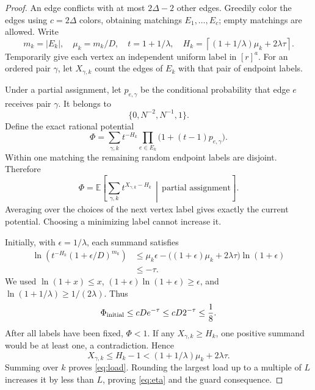 \documentclass[11pt]{article}
\theoremstyle{remark}\newtheorem{remark}[theorem]{Remark}
\newcommand{\ceil}[1]{\left\lceil #1\right\rceil}
\begin{document}
\begin{proof}
An edge conflicts with at most \(2\Delta-2\) other edges. Greedily color the edges using \(c=2\Delta\) colors, obtaining matchings \(E_1,\ldots,E_c\); empty matchings are allowed. Write
\[
 m_k=|E_k|,\quad \mu_k=m_k/D,\quad t=1+1/\lambda,
 \quad H_k=\ceil{(1+1/\lambda)\mu_k+2\lambda\tau}.
\]
Temporarily give each vertex an independent uniform label in \([r]^a\). For an ordered pair \(\gamma\), let \(X_{\gamma,k}\) count the edges of \(E_k\) with that pair of endpoint labels.

Under a partial assignment, let \(p_{e,\gamma}\) be the conditional probability that edge \(e\) receives pair \(\gamma\). It belongs to
\[
 \{0,N^{-2},N^{-1},1\}.
\]
Define the exact rational potential
\begin{equation}
 \Phi=\sum_{\gamma,k}t^{-H_k}
       \prod_{e\in E_k}\bigl(1+(t-1)p_{e,\gamma}\bigr).
 \label{eq:potential}
\end{equation}
Within one matching the remaining random endpoint labels are disjoint. Therefore
\[
 \Phi=\mathbb E\left[\sum_{\gamma,k}t^{X_{\gamma,k}-H_k}
             \,\middle|\,\text{partial assignment}\right].
\]
Averaging over the choices of the next vertex label gives exactly the current potential. Choosing a minimizing label cannot increase it.

Initially, with \(\epsilon=1/\lambda\), each summand satisfies
\begin{align*}
 \ln\!\left(t^{-H_k}(1+\epsilon/D)^{m_k}\right)
 &\le \mu_k\epsilon-\bigl((1+\epsilon)\mu_k+2\lambda\tau\bigr)
                            \ln(1+\epsilon)\\
 &\le-\tau.
\end{align*}
We used \(\ln(1+x)\le x\), \((1+\epsilon)\ln(1+\epsilon)\ge\epsilon\), and \(\ln(1+1/\lambda)\ge1/(2\lambda)\). Thus
\[
 \Phi_{\rm initial}\le cD e^{-\tau}\le cD2^{-\tau}\le\frac18.
\]
After all labels have been fixed, \(\Phi<1\). If any \(X_{\gamma,k}\ge H_k\), one positive summand would be at least one, a contradiction. Hence
\[
 X_{\gamma,k}\le H_k-1
 <(1+1/\lambda)\mu_k+2\lambda\tau.
\]
Summing over \(k\) proves \eqref{eq:load}. Rounding the largest load up to a multiple of \(L\) increases it by less than \(L\), proving \eqref{eq:eta} and the guard consequence.
\end{proof}
\end{document}
